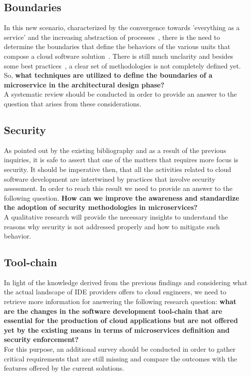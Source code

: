 \documentclass[a4paper, 10pt, conference]{ieeeconf}
\begin{document}
\subsection{Boundaries}

In this new scenario, characterized by the convergence towards 'everything as a service' and the increasing abstraction of processes~\cite{automatic-dev}, there is the need to determine the boundaries that define the behaviors of the various units that compose a cloud software solution~\cite{overview-platforms}. There is still much unclarity and besides some best practices~\cite{research-mss}, a clear set of methodologies is not completely defined yet. So, \textbf{what techniques are utilized to define the boundaries of a microservice in the architectural design phase?}\\
A systematic review should be conducted in order to provide an answer to the question that arises from these considerations.

\subsection{Security}

As pointed out by the existing bibliography and as a result of the previous inquiries, it is safe to assert that one of the matters that requires more focus is security. It should be imperative then, that all the activities related to cloud software development are intertwined by practices that involve security assessment. In order to reach this result we need to provide an answer to the following question.
\textbf{How can we improve the awareness and standardize the adoption of security methodologies in microservices?}\\
A qualitative research will provide the necessary insights to understand the reasons why security is not addressed properly and how to mitigate such behavior.

\subsection{Tool-chain}

In light of the knowledge derived from the previous findings and considering what the actual landscape of IDE providers offers to cloud engineers, we need to retrieve more information for answering the following research question: \textbf{what are the changes in the software development tool-chain that are essential for the production of cloud applications but are not offered yet by the existing means in terms of microservices definition and security enforcement?}\\
For this purpose, an additional survey should be conducted in order to gather critical requirements that are still missing and compare the outcomes with the features offered by the current solutions.
\end{document}
